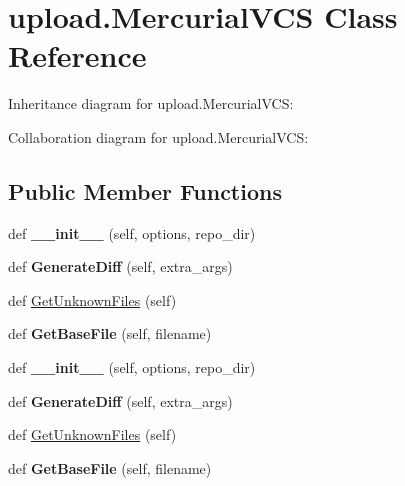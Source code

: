 \hypertarget{classupload_1_1MercurialVCS}{}\section{upload.\+Mercurial\+V\+CS Class Reference}
\label{classupload_1_1MercurialVCS}


Inheritance diagram for upload.\+Mercurial\+V\+CS\+:


Collaboration diagram for upload.\+Mercurial\+V\+CS\+:
\subsection*{Public Member Functions}
\begin{DoxyCompactItemize}
\item 
\mbox{\label{classupload_1_1MercurialVCS_a33890f442dedbb7d9fd45c08b5baed56}} 
def {\bfseries \+\_\+\+\_\+init\+\_\+\+\_\+} (self, options, repo\+\_\+dir)
\item 
\mbox{\label{classupload_1_1MercurialVCS_a6c05746012d8cd435c94ace1465671ef}} 
def {\bfseries Generate\+Diff} (self, extra\+\_\+args)
\item 
def \hyperlink{classupload_1_1MercurialVCS_a6190899fb86cd09ad84cc5d4b0ebd2f3}{Get\+Unknown\+Files} (self)
\item 
\mbox{\label{classupload_1_1MercurialVCS_a0cdc0cbe6ac4daab82f5f01e6ae2e670}} 
def {\bfseries Get\+Base\+File} (self, filename)
\item 
\mbox{\label{classupload_1_1MercurialVCS_a33890f442dedbb7d9fd45c08b5baed56}} 
def {\bfseries \+\_\+\+\_\+init\+\_\+\+\_\+} (self, options, repo\+\_\+dir)
\item 
\mbox{\label{classupload_1_1MercurialVCS_a6c05746012d8cd435c94ace1465671ef}} 
def {\bfseries Generate\+Diff} (self, extra\+\_\+args)
\item 
def \hyperlink{classupload_1_1MercurialVCS_a6190899fb86cd09ad84cc5d4b0ebd2f3}{Get\+Unknown\+Files} (self)
\item 
\mbox{\label{classupload_1_1MercurialVCS_a0cdc0cbe6ac4daab82f5f01e6ae2e670}} 
def {\bfseries Get\+Base\+File} (self, filename)
\end{DoxyCompactItemize}
